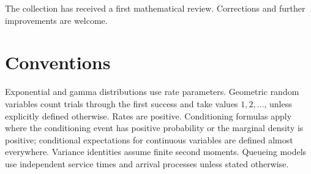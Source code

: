 \documentclass[11pt,a4paper]{article}
\theoremstyle{exercisestyle}
\begin{document}
The collection has received a first mathematical review. Corrections and
further improvements are welcome.

\section*{Conventions}
Exponential and gamma distributions use rate parameters. Geometric
random variables count trials through the first success and take values
$1,2,\ldots$, unless explicitly defined otherwise. Rates are positive.
Conditioning formulas apply where the conditioning event has positive
probability or the marginal density is positive; conditional expectations
for continuous variables are defined almost everywhere. Variance
identities assume finite second moments. Queueing models use independent
service times and arrival processes unless stated otherwise.
\clearpage

\tableofcontents
\clearpage
{}







\end{document}
